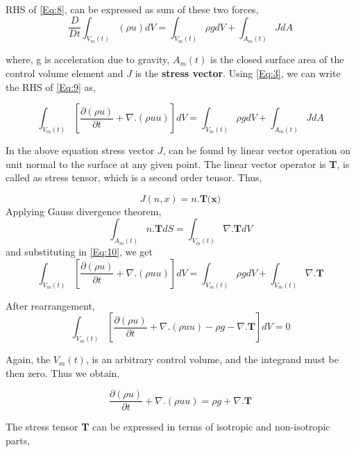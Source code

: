 RHS of \ref{Eq:8}, can be expressed as sum of these two forces,
\begin{equation}
 \frac{D}{Dt}\int_{V_m(t)} (\rho u) d V = \int_{V_m(t)}{\rho g dV} + \int_{A_m(t)}{JdA}
 \label{Eq:9}
\end{equation}

where, g is acceleration due to gravity, $A_m(t)$ is the closed surface area of the control volume element and $J$ is the \textbf{stress vector}.
Using \ref{Eq:3}, we can write the RHS of \ref{Eq:9} as,

\begin{equation}
 \int_{V_m(t)}{}{\left[\frac{\partial (\rho u)}{\partial t} + \nabla . (\rho uu)\right] dV} =  \int_{V_m(t)}{\rho g dV} + \int_{A_m(t)}{JdA}
 \label{Eq:10}
\end{equation}

In the above equation stress vector $J$, can be found by linear vector operation on unit normal to the surface at any given point. The linear vector operator
is \textbf{T}, is called as stress tensor, which is a second order tensor. Thus, 

\begin{equation}
 J(n,x) = n . \textbf{T(x)} 
\end{equation}
Applying Gauss divergence theorem,
\begin{equation}
 \int_{A_m(t)}{n . \textbf{T}}dS  = \int_{V_m(t)}{\nabla . \textbf{T}} dV
\end{equation}
and substituting in \ref{Eq:10}, we get
\begin{equation}
 \int_{V_m(t)}{}{\left[\frac{\partial (\rho u)}{\partial t} + \nabla . (\rho uu)\right] dV} =  \int_{V_m(t)}{\rho g dV} + \int_{V_m(t)}{\nabla . \textbf{T}}
\end{equation}

After rearrangement, 
\begin{equation}
 \int_{V_m(t)}{\left[\frac{\partial (\rho u)}{\partial t} + \nabla . (\rho uu)  -  \rho g  - \nabla . \textbf{T}\right]dV} = 0
\end{equation}

Again, the $V_m(t)$, is an arbitrary control volume, and the integrand must be then zero. Thus we obtain,

\begin{equation}
 \frac{\partial (\rho u)}{\partial t} + \nabla . (\rho uu)  =  \rho g  + \nabla . \textbf{T} 
 \label{Eq:15}
\end{equation}

The stress tensor \textbf{T} can be expressed in terms of isotropic and non-isotropic parts,

